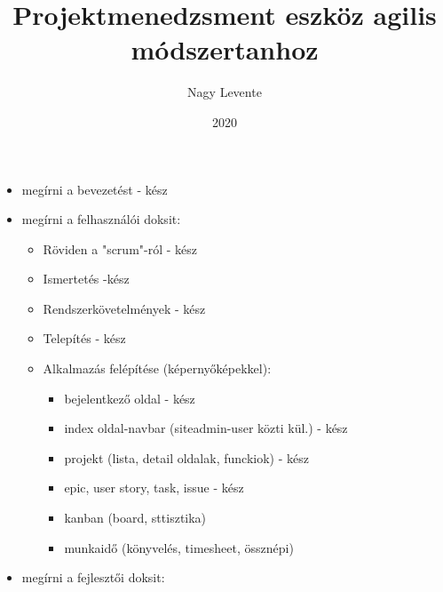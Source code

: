 \documentclass[
]{elteikthesis}[2019/06/10]
\title{ Projektmenedzsment eszköz agilis módszertanhoz} %
\date{2020} %
\author{Nagy Levente}
\affiliation{egyetemi docens} %
\begin{document}

\listoftodos[\todolabel]

\begin{itemize}
  \item megírni a bevezetést - kész
  \item megírni a felhasználói doksit:
  \begin{itemize}
    \item Röviden a "scrum"-ról - kész
    \item Ismertetés -kész
    \item Rendszerkövetelmények - kész
    \item Telepítés - kész
    \item Alkalmazás felépítése (képernyőképekkel):
	\begin{itemize}
		\item bejelentkező oldal - kész
		\item index oldal-navbar (siteadmin-user közti kül.) - kész
		\item projekt (lista, detail oldalak, funckiok) - kész
	 	\item epic, user story, task, issue - kész
		\item kanban (board, sttisztika)
		\item munkaidő (könyvelés, timesheet, össznépi)
	\end{itemize}
  \end{itemize}
  \item megírni a fejlesztői doksit:
\end{itemize}



\maketitle
\topicdeclaration

\tableofcontents
\cleardoublepage


\cleardoublepage


\cleardoublepage


\cleardoublepage
\end{document}
